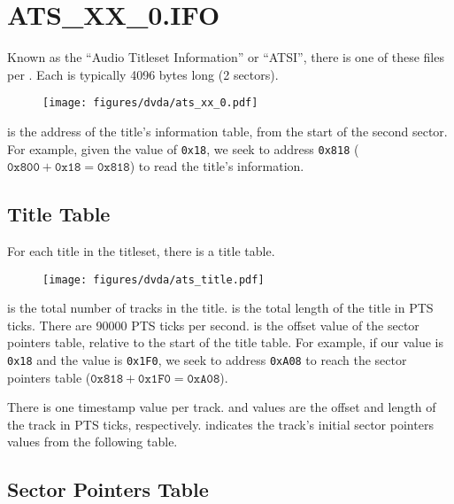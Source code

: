 \section{ATS\_XX\_0.IFO}
Known as the ``Audio Titleset Information'' or ``ATSI'',
there is one of these files per .
Each is typically 4096 bytes long (2 sectors).
\begin{figure}[h]
\texttt{[image: figures/dvda/ats\_xx\_0.pdf]}
\end{figure}
\par
\noindent
{} is the address of the title's
information table, from the start of the second sector.
For example, given the  value of
\texttt{0x18}, we seek to address \texttt{0x818}
($\texttt{0x800} + \texttt{0x18} = \texttt{0x818}$)
to read the title's information.

\clearpage

\subsection{Title Table}
\label{dvda_title_table}
For each title in the titleset, there is a title table.

\begin{figure}[h]
\texttt{[image: figures/dvda/ats\_title.pdf]}
\end{figure}
\par
\noindent
{} is the total number of tracks in the title.
 is the total length of the title in
PTS ticks.
There are 90000 PTS ticks per second.
 is the offset value of the
sector pointers table, relative to the start of the title table.
For example, if our  value is
\texttt{0x18} and the  value is
\texttt{0x1F0}, we seek to address \texttt{0xA08}
to reach the sector pointers table
($\texttt{0x818} + \texttt{0x1F0} = \texttt{0xA08}$).
\par
There is one timestamp value per track.
 and  values
are the offset and length of the track in PTS ticks, respectively.
 indicates the track's initial
sector pointers values from the following table.

\subsection{Sector Pointers Table}

